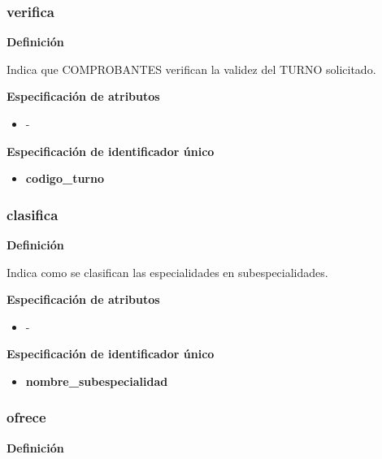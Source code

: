 \documentclass[a4paper,11pt]{article}
\begin{document}
\subsubsection{\textbf{verifica}}

\textbf{Definición}

Indica que COMPROBANTES verifican la validez del TURNO solicitado.

\textbf{Especificación de atributos}

\begin{itemize}

    \item -

\end{itemize}

\textbf{Especificación de identificador único}

\begin{itemize}

     \item \textbf{codigo\_turno}

\end{itemize}


\subsubsection{\textbf{clasifica}}

\textbf{Definición}

Indica como se clasifican las especialidades en subespecialidades.

\textbf{Especificación de atributos}

\begin{itemize}

    \item -

\end{itemize}

\textbf{Especificación de identificador único}

\begin{itemize}

     \item \textbf{nombre\_subespecialidad}

\end{itemize}


\subsubsection{\textbf{ofrece}}

\textbf{Definición}
\end{document}

